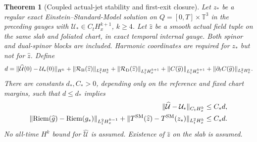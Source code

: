 \documentclass[11pt]{article}
\numberwithin{equation}{section}
\newtheorem{theorem}{Theorem}[section]
\theoremstyle{definition}
\theoremstyle{remark}
\newcommand{\Riem}{\operatorname{Riem}}
\newcommand{\norm}[1]{\lVert#1\rVert}
\begin{document}
\begin{theorem}[Coupled actual-jet stability and first-exit closure]
\label{prop:coupled-bootstrap}
Let $z_*$ be a regular exact Einstein--Standard-Model solution on $Q=[0,T]\times\mathbb T^3$ in the preceding gauges with $\mathcal U_*\in C_tH_x^{k+1}$, $k\ge4$.  Let $\widehat z$ be a smooth actual field tuple on the same slab and
foliated chart, in exact temporal internal gauge. Both spinor and dual-spinor
blocks are included. Harmonic coordinates are required for $z_*$ but not
for $\widehat z$. Define
\[
 d=\norm{\widehat{\mathcal U}(0)-\mathcal U_*(0)}_{H^k}
 +\norm{\mathcal R_{\rm B}(\widehat z)}_{L^2_tH_x^k}
 +\norm{\mathcal R_{\rm D}(\widehat z)}_{L^2_tH_x^{k+1}}
 +\norm{C(\widehat g)}_{L^2_tH_x^{k+1}}
 +\norm{\partial_tC(\widehat g)}_{L^2_tH_x^k}.
\]
There are constants $d_*,C_*>0$, depending only on the reference and fixed chart margins, such that $d\le d_*$ implies
\begin{align}
 \norm{\widehat{\mathcal U}-\mathcal U_*}_{C_tH_x^k}&\le C_*d,\label{eq:bootstrap-state}\\
 \norm{\Riem(\widehat g)-\Riem(g_*)}_{L^2_tH_x^{k-1}}
 +\norm{T^{\rm SM}(\widehat z)-T^{\rm SM}(z_*)}_{L^2_tH_x^k}
 &\le C_*d.\label{eq:bootstrap-curvature}
\end{align}
No all-time $H^k$ bound for $\widehat{\mathcal U}$ is assumed.  Existence of $\widehat z$ on the slab is assumed.
\end{theorem}
\end{document}
